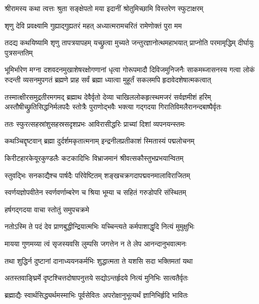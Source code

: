 \twolineshloka
{श्रीरामस्य कथा त्वत्तः श्रुता सङ्क्षेपतो मया}
{इदानीं श्रोतुमिच्छामि विस्तरेण स्फुटाक्षरम्} %


\twolineshloka
{शृणु देवि प्रवक्ष्यामि गुह्याद्गुह्यतरं महत्}
{अध्यात्मरामचरितं रामेणोक्तं पुरा मम} %

\threelineshloka
{तदद्य कथयिष्यामि शृणु तापत्रयापहम्}
{यच्छ्रुत्वा मुच्यते जन्तुरज्ञानोत्थमहाभयात्}
{प्राप्नोति परमामृद्धिम् दीर्घायुः पुत्रसन्ततिम्} %

\fourlineindentedshloka
{भूमिर्भारेण मग्ना दशवदनमुखाशेषरक्षोगणानां}
{धृत्वा गोरूपमादौ दिविजमुनिजनैः साकमब्जासनस्य}
{गत्वा लोकं रुदन्ती व्यसनमुपगतं ब्रह्मणे प्राह सर्वं}
{ब्रह्मा ध्यात्वा मुहूर्तं सकलमपि हृदावेदशेषात्मकत्वात्} %

\fourlineindentedshloka
{तस्मात्क्षीरसमुद्रतीरमगमद् ब्रह्माथ देवैर्वृतो}
{देव्या चाखिललोकहृत्स्थमजरं सर्वज्ञमीशं हरिम्}
{अस्तौषीच्छ्रुतिसिद्धनिर्मलपदैः स्तोत्रैः पुराणोद्भवैः}
{भक्त्या गद्गदया गिरातिविमलैरानन्दबाष्पैर्वृतः} %

\twolineshloka
{ततः स्फुरत्सहस्रांशुसहस्रसदृशप्रभः}
{आविरासीद्धरिः प्राच्यां दिशां व्यपनयन्स्तमः} %

\twolineshloka
{कथञ्चिद्दृष्टवान् ब्रह्मा दुर्दर्शमकृतात्मनाम्}
{इन्द्रनीलप्रतीकाशं स्मितास्यं पद्मलोचनम्} %

\twolineshloka
{किरीटहारकेयूरकुण्डलैः कटकादिभिः}
{विभ्राजमानं श्रीवत्सकौस्तुभप्रभयान्वितम्} %

\twolineshloka
{स्तुवद्भिः सनकाद्यैश्च पार्षदैः परिवेष्टितम्}
{शङ्खचक्रगदापद्मवनमालाविराजितम्} %

\twolineshloka
{स्वर्णयज्ञोपवीतेन स्वर्णवर्णाम्बरेण च}
{श्रिया भूम्या च सहितं गरुडोपरि संस्थितम्} %

\onelineshloka
{हर्षगद्गदया वाचा स्तोतुं समुपचक्रमे} %


\twolineshloka
{नतोऽस्मि ते पदं देव प्राणबुद्धीन्द्रियात्मभिः}
{यच्चिन्त्यते कर्मपाशाद्धृदि नित्यं मुमुक्षुभिः} %

\twolineshloka
{मायया गुणमय्या त्वं सृजस्यवसि लुम्पसि}
{जगत्तेन न ते लेप आनन्दानुभवात्मनः} %

\twolineshloka
{तथा शुद्धिर्न दुष्टानां दानाध्ययनकर्मभिः}
{शुद्धात्मता ते यशसि सदा भक्तिमतां यथा} %

\twolineshloka
{अतस्तवाङ्घ्रिर्मे दृष्टश्चित्तदोषापनुत्तये}
{सद्योऽन्तर्हृदये नित्यं मुनिभिः सात्वतैर्वृतः} %

\twolineshloka
{ब्रह्माद्यैः स्वार्थसिद्ध्यर्थमस्माभिः पूर्वसेवितः}
{अपरोक्षानुभूत्यर्थं ज्ञानिभिर्हृदि भावितः} %

